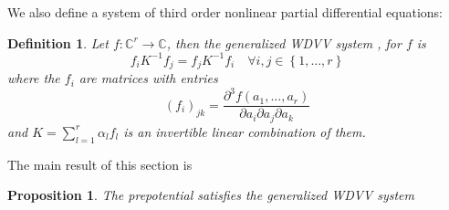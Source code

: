 \documentclass[a4paper,11pt]{article}
\newtheorem{definition}[theorem]{Definition}
\newtheorem{proposition}[theorem]{Proposition}
\numberwithin{equation}{section}
\begin{document}
\noindent We also define a system of third order nonlinear partial
differential equations:

\begin{definition}
Let $f:\mathbb{C}^{r}\rightarrow \mathbb{C}$, then the generalized WDVV
system \cite{BONE-MATO:1996}, \cite{MARS-MIRO-MORO:1996} for $f$ is 
\begin{equation}
f_{i}K^{-1}f_{j}=f_{j}K^{-1}f_{i}\quad \forall i,j\in \left\{
1,...,r\right\} 
\end{equation}
where the $f_{i}$ are matrices with entries 
\begin{equation}
(f_{i})_{jk}=\dfrac{\partial ^{3}f(a_{1},...,a_{r})}{\partial a_{i}\partial
a_{j}\partial a_{k}}
\end{equation}
and $K=\sum_{l=1}^{r}\alpha _{l}f_{l}$ is an invertible linear combination
of them.
\end{definition}

\bigskip

\noindent The main result of this section is

\begin{proposition}
The prepotential satisfies the generalized WDVV system
\end{proposition}
\end{document}
